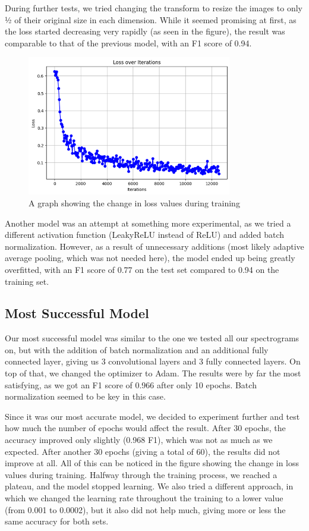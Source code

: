 \documentclass[11pt, letterpaper]{article}
\begin{document}
During further tests, we tried changing the transform to resize the images to only ½ of their original size in each dimension. While it seemed promising at first, as the loss started decreasing very rapidly (as seen in the figure), the result was comparable to that of the previous model, with an F1 score of 0.94.

\begin{figure}[H]
    \centering
    \includegraphics[width=0.8\textwidth]{lossplot1.png}
    \caption{A graph showing the change in loss values during training}
\end{figure}

Another model was an attempt at something more experimental, as we tried a different activation function (LeakyReLU instead of ReLU) and added batch normalization. However, as a result of unnecessary additions (most likely adaptive average pooling, which was not needed here), the model ended up being greatly overfitted, with an F1 score of 0.77 on the test set compared to 0.94 on the training set.

\subsection{Most Successful Model}

Our most successful model was similar to the one we tested all our spectrograms on, but with the addition of batch normalization and an additional fully connected layer, giving us 3 convolutional layers and 3 fully connected layers. On top of that, we changed the optimizer to Adam. The results were by far the most satisfying, as we got an F1 score of 0.966 after only 10 epochs. Batch normalization seemed to be key in this case.

Since it was our most accurate model, we decided to experiment further and test how much the number of epochs would affect the result. After 30 epochs, the accuracy improved only slightly (0.968 F1), which was not as much as we expected. After another 30 epochs (giving a total of 60), the results did not improve at all. All of this can be noticed in the figure showing the change in loss values during training. Halfway through the training process, we reached a plateau, and the model stopped learning. We also tried a different approach, in which we changed the learning rate throughout the training to a lower value (from 0.001 to 0.0002), but it also did not help much, giving more or less the same accuracy for both sets.
\end{document}
